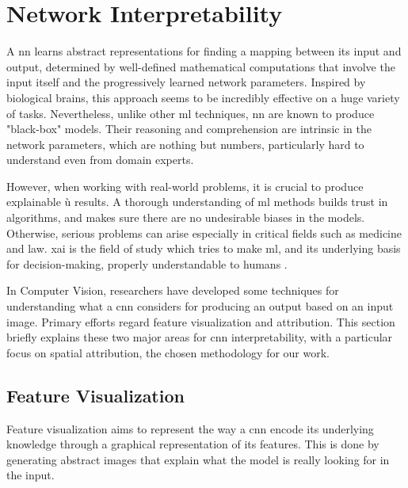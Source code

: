 \section{Network Interpretability}
\label{sec:network-interpretability}


A \gls{nn} learns abstract representations for finding a mapping between its input and output, determined by well-defined mathematical computations that involve the input itself and the progressively learned network parameters. Inspired by biological brains, this approach seems to be incredibly effective on a huge variety of tasks. Nevertheless, unlike other \gls{ml} techniques, \gls{nn} are known to produce "black-box" models. Their reasoning and comprehension are intrinsic in the network parameters, which are nothing but numbers, particularly hard to understand even from domain experts. 

However, when working with real-world problems, it is crucial to produce explainable ù results. A thorough understanding of \gls{ml} methods builds trust in algorithms, and makes sure there are no undesirable biases in the models. Otherwise, serious problems can arise especially in critical fields such as medicine and law. \gls{xai} is the field of study which tries to make \gls{ml}, and its underlying basis for decision-making, properly understandable to humans \cite{xai-wiki}.

In Computer Vision, researchers have developed some techniques for understanding what a \gls{cnn} considers for producing an output based on an input image. Primary efforts regard feature visualization and attribution. This section briefly explains these two major areas for \gls{cnn} interpretability, with a particular focus on spatial attribution, the chosen methodology for our work.



\subsection{Feature Visualization}
\label{subsec:feature-vis}


Feature visualization aims to represent the way a \gls{cnn} encode its underlying knowledge through a graphical representation of its features. This is done by generating abstract images that explain what the model is really looking for in the input. 

